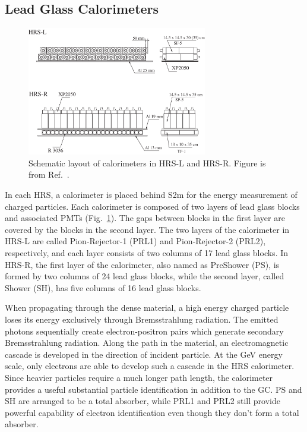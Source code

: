 \subsection{Lead Glass Calorimeters}
\begin{figure}[!ht]
 \begin{center}
  \includegraphics[width=0.7\textwidth]{./figures/calo/ShowerBoth}
  \caption[Schematic layout of calorimeters in HRS-L and HRS-R]{\footnotesize{Schematic layout of calorimeters in HRS-L and HRS-R. Figure is from Ref.~\cite{halla_nim}.}}
  \label{shower}
 \end{center}
\end{figure}

 In each HRS, a calorimeter is placed behind S2m for the energy measurement of charged particles. Each calorimeter is composed of two layers of lead glass blocks and associated PMTs (Fig.~\ref{shower}). The gaps between blocks in the first layer are covered by the blocks in the second layer. The two layers of the calorimeter in HRS-L are called Pion-Rejector-1 (PRL1) and Pion-Rejector-2 (PRL2), respectively, and each layer consists of two columns of 17 lead glass blocks. In HRS-R, the first layer of the calorimeter, also named as PreShower (PS), is formed by two columns of 24 lead glass blocks, while the second layer, called Shower (SH), has five columns of 16 lead glass blocks. 

 When propagating through the dense material, a high energy charged particle loses its energy exclusively through Bremsstrahlung radiation. The emitted photons sequentially create electron-positron pairs which generate secondary Bremsstrahlung radiation. Along the path in the material, an electromagnetic cascade is developed in the direction of incident particle. At the GeV energy scale, only electrons are able to develop such a cascade in the HRS calorimeter. Since heavier particles require a much longer path length, the calorimeter provides a useful substantial particle identification in addition to the GC. PS and SH are arranged to be a total absorber, while PRL1 and PRL2 still provide powerful capability of electron identification even though they don't form a total absorber.
